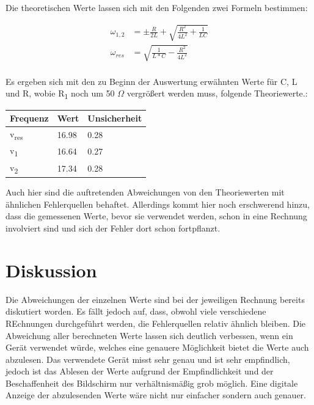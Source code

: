 \documentclass[titlepage=firstcover, captions=tableheading]{scrartcl}
\begin{document}
Die theoretischen Werte lassen sich mit den Folgenden zwei Formeln bestimmen:

\begin{align}
    \omega_{1,2} &= \pm \frac{R}{2L} + \sqrt{\frac{R^2}{4L^2}+\frac{1}{LC}} \nonumber\\
    \omega_{res} &= \sqrt{\frac{1}{L*C}-\frac{R^2}{4L^2}} \nonumber \\
\end{align}

\noindent Es ergeben sich mit den zu Beginn der Auswertung erwähnten Werte für C, L und R, wobie R\textsubscript{1} noch um 50 $\Omega$ vergrößert werden muss,
folgende Theoriewerte.:

\begin{center}
    \begin{tabular}{ll@{${}\pm{}$}l}
        \toprule
        Frequenz & Wert & Unsicherheit\\
        \midrule
        v\textsubscript{res} & 16.98 & 0.28     \\
        v\textsubscript{1} &  16.64 & 0.27      \\
        v\textsubscript{2} &  17.34 & 0.28      \\
        \bottomrule  
    \end{tabular}
\end{center}

\noindent Auch hier sind die auftretenden Abweichungen von den Theoriewerten mit ähnlichen Fehlerquellen behaftet.
Allerdings kommt hier noch erschwerend hinzu, dass die gemessenen Werte, 
bevor sie verwendet werden, 
schon in eine Rechnung involviert sind und sich der Fehler dort schon fortpflanzt.

\section{Diskussion}

Die Abweichungen der einzelnen Werte sind bei der jeweiligen Rechnung bereits diskutiert worden.
Es fällt jedoch auf, dass, obwohl viele verschiedene REchnungen durchgeführt werden, die Fehlerquellen relativ ähnlich bleiben.
Die Abweichung aller berechneten Werte lassen sich deutlich verbessen, wenn ein Gerät verwendet würde, 
welches eine genauere Möglichkeit bietet die Werte auch abzulesen. 
Das verwendete Gerät misst sehr genau und ist sehr empfindlich, jedoch ist das Ablesen der Werte aufgrund der Empfindlichkeit 
und der Beschaffenheit des Bildschirm nur verhältnismäßig grob möglich.
Eine digitale Anzeige der abzulesenden Werte wäre nicht nur einfacher sondern auch genauer.
\end{document}
